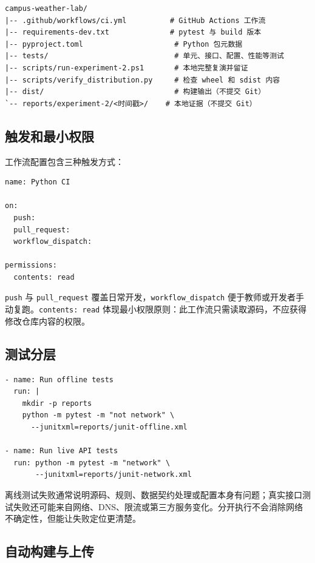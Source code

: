 \documentclass[UTF8,zihao=-4,a4paper]{ctexart}
\newcommand{\code}[1]{\texttt{#1}}
\begin{document}
\begin{lstlisting}[style=shellstyle]
campus-weather-lab/
|-- .github/workflows/ci.yml          # GitHub Actions 工作流
|-- requirements-dev.txt              # pytest 与 build 版本
|-- pyproject.toml                     # Python 包元数据
|-- tests/                             # 单元、接口、配置、性能等测试
|-- scripts/run-experiment-2.ps1       # 本地完整复演并留证
|-- scripts/verify_distribution.py     # 检查 wheel 和 sdist 内容
|-- dist/                              # 构建输出（不提交 Git）
`-- reports/experiment-2/<时间戳>/    # 本地证据（不提交 Git）
\end{lstlisting}

\subsection{触发和最小权限}

工作流配置包含三种触发方式：

\begin{lstlisting}[style=codestyle]
name: Python CI

on:
  push:
  pull_request:
  workflow_dispatch:

permissions:
  contents: read
\end{lstlisting}

\code{push} 与 \code{pull\_request} 覆盖日常开发，\code{workflow\_dispatch} 便于教师或开发者手动复跑。\code{contents: read} 体现最小权限原则：此工作流只需读取源码，不应获得修改仓库内容的权限。

\subsection{测试分层}

\begin{lstlisting}[style=codestyle]
- name: Run offline tests
  run: |
    mkdir -p reports
    python -m pytest -m "not network" \
      --junitxml=reports/junit-offline.xml

- name: Run live API tests
  run: python -m pytest -m "network" \
       --junitxml=reports/junit-network.xml
\end{lstlisting}

离线测试失败通常说明源码、规则、数据契约处理或配置本身有问题；真实接口测试失败还可能来自网络、DNS、限流或第三方服务变化。分开执行不会消除网络不确定性，但能让失败定位更清楚。

\subsection{自动构建与上传}
\end{document}
